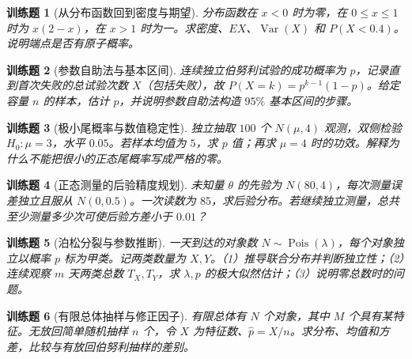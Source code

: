 \documentclass[UTF8,12pt,a4paper,fontset=fandol]{ctexbook}
\newtheorem{exercise}{训练题}[section]
\begin{document}
\begin{exercise}[从分布函数回到密度与期望]\label{q:M-PF-21}
分布函数在 $x<0$ 时为零，在 $0\le x\le1$ 时为 $x(2-x)$，在 $x>1$ 时为一。求密度、$EX$、$\operatorname{Var}(X)$ 和 $P(X<0.4)$。说明端点是否有原子概率。\par{}\end{exercise}

\begin{exercise}[参数自助法与基本区间]\label{q:M-PF-29}
连续独立伯努利试验的成功概率为 $p$，记录直到首次失败的总试验次数 $X$（包括失败），故 $P(X=k)=p^{k-1}(1-p)$。给定容量 $n$ 的样本，估计 $p$，并说明参数自助法构造 $95\%$ 基本区间的步骤。\par{}\end{exercise}

\begin{exercise}[极小尾概率与数值稳定性]\label{q:M-PF-30}
独立抽取 $100$ 个 $N(\mu,4)$ 观测，双侧检验 $H_0:\mu=3$，水平 $0.05$。若样本均值为 $5$，求 $p$ 值；再求 $\mu=4$ 时的功效。解释为什么不能把很小的正态尾概率写成严格的零。\par{}\end{exercise}

\begin{exercise}[正态测量的后验精度规划]\label{q:M-PF-31}
未知量 $\theta$ 的先验为 $N(80,4)$，每次测量误差独立且服从 $N(0,0.5)$。一次读数为 $85$，求后验分布。若继续独立测量，总共至少测量多少次可使后验方差小于 $0.01$？\par{}\end{exercise}

\begin{exercise}[泊松分裂与参数推断]\label{q:B17.1}
一天到达的对象数 $N\sim\operatorname{Pois}(\lambda)$，每个对象独立以概率 $p$ 标为甲类。记两类数量为 $X,Y$。（1）推导联合分布并判断独立性；（2）连续观察 $m$ 天两类总数 $T_X,T_Y$，求 $\lambda,p$ 的极大似然估计；（3）说明零总数时的问题。\par{}\end{exercise}

\begin{exercise}[有限总体抽样与修正因子]\label{q:B17.2}
有限总体有 $N$ 个对象，其中 $M$ 个具有某特征。无放回简单随机抽样 $n$ 个，令 $X$ 为特征数、$\widehat p=X/n$。求分布、均值和方差，比较与有放回伯努利抽样的差别。\par{}\end{exercise}
\end{document}
